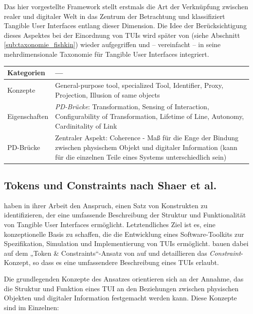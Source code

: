 Das hier vorgestellte Framework stellt erstmals die Art der Verknüpfung zwischen realer und digitaler Welt in das Zentrum der Betrachtung und klassifiziert Tangible User Interfaces entlang dieser Dimension. Die Idee der Berücksichtigung dieses Aspektes bei der Einordnung von \glspl{TUI} wird später von \citet{Fishkin04} (siehe Abschnitt \ref{sub:taxonomie_fishkin}) wieder aufgegriffen und -- vereinfacht -- in seine mehrdimensionale Taxonomie für Tangible User Interfaces integriert.
\\[1em]
\begin{tabular}{| p{3cm} | p{10cm} |}
  \hline
  Kategorien & --- \\ \hline
  Konzepte & General-purpose tool, specialized Tool, Identifier, Proxy, Projection, Illusion of same objects \\ \hline
  Eigenschaften & \emph{PD-Brücke}: Transformation, Sensing of Interaction, Configurability of Transformation, Lifetime of Line, Autonomy, Cardinitality of Link \\ \hline
  PD-Brücke & Zentraler Aspekt: Coherence - Maß für die Enge der Bindung zwischen physischem Objekt und digitaler Information (kann für die einzelnen Teile eines Systems unterschiedlich sein) \\ \hline
\end{tabular} 


\subsection{Tokens und Constraints nach Shaer et al.} %
\label{sub:tokens_und_constraints_nach_shaer_et_al_}

\citet{Shaer04} haben in ihrer Arbeit den Anspruch, einen Satz von Konstrukten zu identifizieren, der eine umfassende Beschreibung der Struktur und Funktionalität von Tangible User Interfaces ermöglicht. Letztendliches Ziel ist es, eine konzeptionelle Basis zu schaffen, die die Entwicklung eines Software-Toolkits zur Spezifikation, Simulation und Implementierung von \glspl{TUI} ermöglicht. \citet{Shaer04} bauen dabei auf dem „Token \& Constraints“-Ansatz von \citet{Ullmer02} auf und detaillieren das \emph{Constraint}-Konzept, so dass es eine umfassendere Beschreibung eines \glspl{TUI} erlaubt. 

Die grundlegenden Konzepte des Ansatzes orientieren sich an der Annahme, das die Struktur und Funktion eines \gls{TUI} an den Beziehungen zwischen physischen Objekten und digitaler Information festgemacht werden kann. Diese Konzepte sind im Einzelnen:

